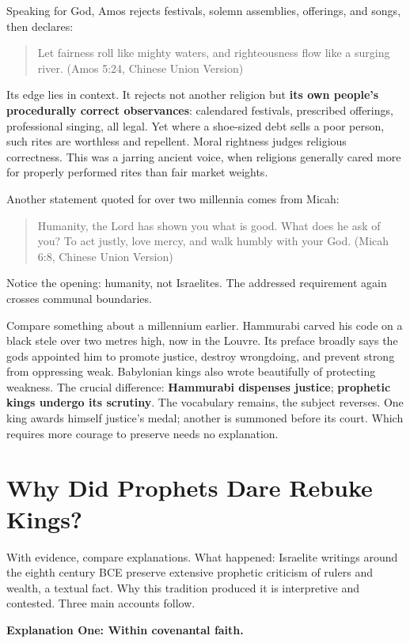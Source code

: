 Speaking for God, Amos rejects festivals, solemn assemblies, offerings, and songs, then declares:

\begin{quote}
Let fairness roll like mighty waters, and righteousness flow like a surging river. (Amos 5:24, Chinese Union Version)
\end{quote}
Its edge lies in context. It rejects not another religion but \textbf{its own people's procedurally correct observances}: calendared festivals, prescribed offerings, professional singing, all legal. Yet where a shoe-sized debt sells a poor person, such rites are worthless and repellent. Moral rightness judges religious correctness. This was a jarring ancient voice, when religions generally cared more for properly performed rites than fair market weights.

Another statement quoted for over two millennia comes from Micah:

\begin{quote}
Humanity, the Lord has shown you what is good. What does he ask of you? To act justly, love mercy, and walk humbly with your God. (Micah 6:8, Chinese Union Version)
\end{quote}
Notice the opening: humanity, not Israelites. The addressed requirement again crosses communal boundaries.

Compare something about a millennium earlier. Hammurabi carved his code on a black stele over two metres high, now in the Louvre. Its preface broadly says the gods appointed him to promote justice, destroy wrongdoing, and prevent strong from oppressing weak. Babylonian kings also wrote beautifully of protecting weakness. The crucial difference: \textbf{Hammurabi dispenses justice}; \textbf{prophetic kings undergo its scrutiny}. The vocabulary remains, the subject reverses. One king awards himself justice's medal; another is summoned before its court. Which requires more courage to preserve needs no explanation.

\section{Why Did Prophets Dare Rebuke Kings?}
With evidence, compare explanations. What happened: Israelite writings around the eighth century BCE preserve extensive prophetic criticism of rulers and wealth, a textual fact. Why this tradition produced it is interpretive and contested. Three main accounts follow.

\textbf{Explanation One: Within covenantal faith.}

